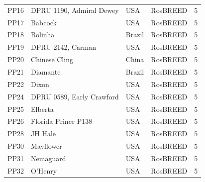\documentclass[12pt]{article}
\begin{document}
\begin{center}
\begin{longtable}{llllc}
	PP16 &DPRU 1190, Admiral Dewey&USA &RosBREED &5\\
	PP17 &Babcock &USA &RosBREED &5\\
	PP18 &Bolinha &Brazil &RosBREED &5\\
	PP19 &DPRU 2142, Carman &USA &RosBREED &5\\
	PP20 &Chinese Cling&China &RosBREED &5\\
	PP21 &Diamante&Brazil &RosBREED &5\\
	PP22 &Dixon&USA &RosBREED &5\\
	PP24 &DPRU 0589, Early Crawford &USA &RosBREED &5\\
	PP25 &Elberta&USA &RosBREED &5\\
	PP26 &Florida Prince P138&USA &RosBREED &5\\
	PP28 &JH Hale&USA &RosBREED &5\\
	PP30 &Mayflower&USA &RosBREED &5\\
	PP31 &Nemaguard &USA &RosBREED &5\\
	PP32 &O'Henry &USA &RosBREED &5\\

\end{longtable}
\end{center}
\end{document}
